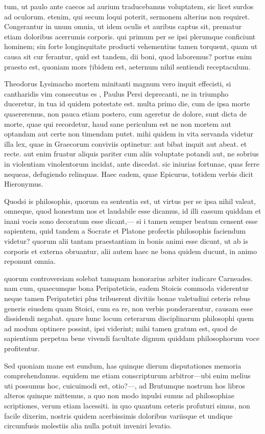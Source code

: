  tum, ut paulo ante caecos ad aurium traducebamus voluptatem, sic licet surdos ad oculorum. etenim, qui secum loqui poterit, sermonem alterius non requiret. Congerantur in unum omnia, ut idem oculis et auribus captus sit, prematur etiam doloribus acerrumis corporis. qui primum per se ipsi plerumque conficiunt hominem; sin forte longinquitate producti vehementius tamen torquent, quam ut causa sit cur ferantur, quid est tandem, dii boni, quod laboremus? portus enim praesto est, quoniam mors †ibidem est, aeternum nihil sentiendi receptaculum.

 Theodorus Lysimacho mortem minitanti magnum vero inquit effecisti, si cantharidis vim consecutus es , Paulus Persi deprecanti, ne in triumpho duceretur, in tua id quidem potestate est. multa primo die, cum de ipsa morte quaereremus, non pauca etiam postero, cum ageretur de dolore, sunt dicta de morte, quae qui recordetur, haud sane periculum est ne non mortem aut optandam aut certe non timendam putet. mihi quidem in vita servanda videtur illa lex, quae in Graecorum conviviis optinetur: aut bibat inquit aut abeat. et recte. aut enim fruatur aliquis pariter cum aliis voluptate potandi aut, ne sobrius in violentiam vinolentorum incidat, ante discedat. sic iniurias fortunae, quas ferre nequeas, defugiendo relinquas. Haec eadem, quae Epicurus, totidem verbis dicit Hieronymus.

 Quodsi is philosophis, quorum ea sententia est, ut virtus per se ipsa nihil valeat, omneque, quod honestum nos et laudabile esse dicamus, id illi cassum quiddam et inani vocis sono decoratum esse dicant,— si i tamen semper beatum censent esse sapientem, quid tandem a Socrate et Platone profectis philosophis faciendum videtur? quorum alii tantam praestantiam in bonis animi esse dicunt, ut ab is corporis et externa obruantur, alii autem haec ne bona quidem ducunt, in animo reponunt omnia.

 quorum controversiam solebat tamquam honorarius arbiter iudicare Carneades. nam cum, quaecumque bona Peripateticis, eadem Stoicis commoda viderentur neque tamen Peripatetici plus tribuerent divitiis bonae valetudini ceteris rebus generis eiusdem quam Stoici, cum ea re, non verbis ponderarentur, causam esse dissidendi negabat. quare hunc locum ceterarum disciplinarum philosophi quem ad modum optinere possint, ipsi viderint; mihi tamen gratum est, quod de sapientium perpetua bene vivendi facultate dignum quiddam philosophorum voce profitentur.

 Sed quoniam mane est eundum, has quinque dierum disputationes memoria comprehendamus. equidem me etiam conscripturum arbitror—ubi enim melius uti possumus hoc, cuicuimodi est, otio?—, ad Brutumque nostrum hos libros alteros quinque mittemus, a quo non modo inpulsi sumus ad philosophiae scriptiones, verum etiam lacessiti. in quo quantum ceteris profuturi simus, non facile dixerim, nostris quidem acerbissimis doloribus variisque et undique circumfusis molestiis alia nulla potuit inveniri levatio.
